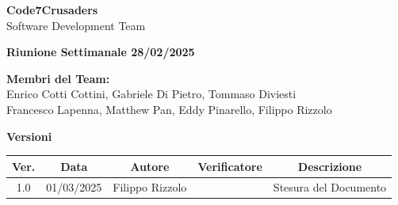 \documentclass{article}
\begin{document}
\begin{titlepage}
    {\Huge \textbf{Code7Crusaders}}\\
    \vspace{0.5cm}
    {\Large Software Development Team}\\
    \vspace{2cm}
        
        {\large \textbf{Riunione Settimanale 28/02/2025}}\\
    \vspace{5cm}                           %
    
    
    \textbf{Membri del Team:}\\
    Enrico Cotti Cottini, Gabriele Di Pietro, Tommaso Diviesti \\
    Francesco Lapenna, Matthew Pan, Eddy Pinarello, Filippo Rizzolo \\
    \vspace{0.5cm}
    
    \vspace{1cm}
\end{titlepage}



\newpage
\begin{table}[h!]
\centering
\textbf{Versioni} \\ %
\vspace{2mm} %
\begin{tabular}{|c|c|c|c|c|}
    \hline
    \textbf{Ver.} & \textbf{Data} & \textbf{Autore} & \textbf{Verificatore} & \textbf{Descrizione} \\
    \hline
    1.0 & 01/03/2025 & Filippo Rizzolo &  & Stesura del Documento \\ 
    \hline                                  %
\end{tabular}
\end{table}



\newpage
\end{document}
